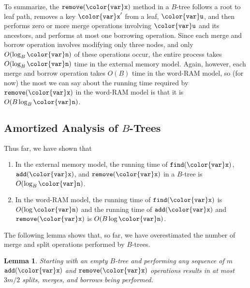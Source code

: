 \documentclass[10pt]{book}
\newcommand{\seclabel}[1]{\label{sec:#1}}
\theoremstyle{plain}
\newtheorem{lem}{Lemma}[chapter]
\newcommand{\lemlabel}[1]{\label{lem:#1}}
\theoremstyle{definition}
\begin{document}
To summarize, the \ensuremath{\mathtt{remove({\color{var}x})}} method in a $B$-tree follows a root to
leaf path, removes a key \ensuremath{\mathtt{{\color{var}x}'}} from a leaf, \ensuremath{\mathtt{{\color{var}u}}}, and then performs zero
or more merge operations involving \ensuremath{\mathtt{{\color{var}u}}} and its ancestors, and performs
at most one borrowing operation.  Since each merge and borrow operation
involves modifying only three nodes, and only $O(\log_B \ensuremath{\mathtt{{\color{var}n}}})$ of these
operations occur, the entire process takes $O(\log_B \ensuremath{\mathtt{{\color{var}n}}})$ time in the
external memory model.  Again, however, each merge and borrow operation
takes $O(B)$ time in the word-RAM model, so (for now) the most we can
say about the running time required by \ensuremath{\mathtt{remove({\color{var}x})}} in the word-RAM model
is that it is $O(B\log_B \ensuremath{\mathtt{{\color{var}n}}})$.

\subsection{Amortized Analysis of $B$-Trees}
\seclabel{btree-amortized}

Thus far, we have shown that
\begin{enumerate}
  \item In the external memory model, the running time of \ensuremath{\mathtt{find({\color{var}x})}},
    \ensuremath{\mathtt{add({\color{var}x})}}, and \ensuremath{\mathtt{remove({\color{var}x})}} in a $B$-tree is $O(\log_B \ensuremath{\mathtt{{\color{var}n}}})$.
  \item In the word-RAM model, the running time of \ensuremath{\mathtt{find({\color{var}x})}} is $O(\log \ensuremath{\mathtt{{\color{var}n}}})$
    and the running time of \ensuremath{\mathtt{add({\color{var}x})}} and \ensuremath{\mathtt{remove({\color{var}x})}} is $O(B\log \ensuremath{\mathtt{{\color{var}n}}})$.
\end{enumerate}

The following lemma shows that, so far, we have overestimated the number of merge and split operations performed by $B$-trees.

\begin{lem}\lemlabel{btree-split}
  Starting with an empty $B$-tree and performing any sequence of
  $m$ \ensuremath{\mathtt{add({\color{var}x})}} and \ensuremath{\mathtt{remove({\color{var}x})}} operations results in at most $3m/2$ splits,
  merges, and borrows being performed.
\end{lem}
\end{document}
